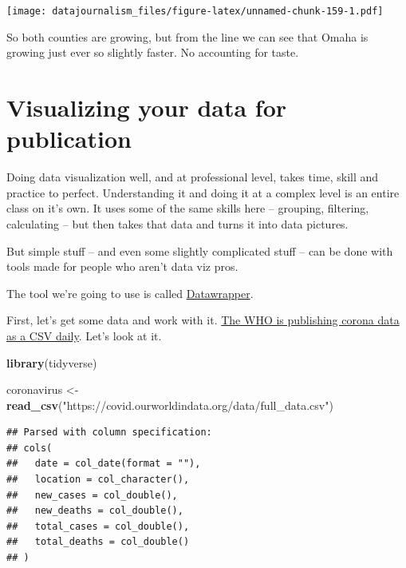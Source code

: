 \documentclass[]{book}
\newenvironment{Shaded}{\begin{snugshade}}{\end{snugshade}}
\newcommand{\KeywordTok}[1]{\textcolor[rgb]{0.13,0.29,0.53}{\textbf{#1}}}
\newcommand{\NormalTok}[1]{#1}
\newcommand{\StringTok}[1]{\textcolor[rgb]{0.31,0.60,0.02}{#1}}
\begin{document}
\texttt{[image: datajournalism\_files/figure-latex/unnamed-chunk-159-1.pdf]}

So both counties are growing, but from the line we can see that Omaha is growing just ever so slightly faster. No accounting for taste.

\hypertarget{visualizing-your-data-for-publication}{%
\chapter{Visualizing your data for publication}\label{visualizing-your-data-for-publication}}

Doing data visualization well, and at professional level, takes time, skill and practice to perfect. Understanding it and doing it at a complex level is an entire class on it's own. It uses some of the same skills here -- grouping, filtering, calculating -- but then takes that data and turns it into data pictures.

But simple stuff -- and even some slightly complicated stuff -- can be done with tools made for people who aren't data viz pros.

The tool we're going to use is called \href{https://www.datawrapper.de/}{Datawrapper}.

First, let's get some data and work with it. \href{https://ourworldindata.org/coronavirus-source-data}{The WHO is publishing corona data as a CSV daily}. Let's look at it.

\begin{Shaded}
\begin{Highlighting}[]
\KeywordTok{library}\NormalTok{(tidyverse)}
\end{Highlighting}
\end{Shaded}

\begin{Shaded}
\begin{Highlighting}[]
\NormalTok{coronavirus <-}\StringTok{ }\KeywordTok{read_csv}\NormalTok{(}\StringTok{"https://covid.ourworldindata.org/data/full_data.csv"}\NormalTok{)}
\end{Highlighting}
\end{Shaded}

\begin{verbatim}
## Parsed with column specification:
## cols(
##   date = col_date(format = ""),
##   location = col_character(),
##   new_cases = col_double(),
##   new_deaths = col_double(),
##   total_cases = col_double(),
##   total_deaths = col_double()
## )
\end{verbatim}
\end{document}
